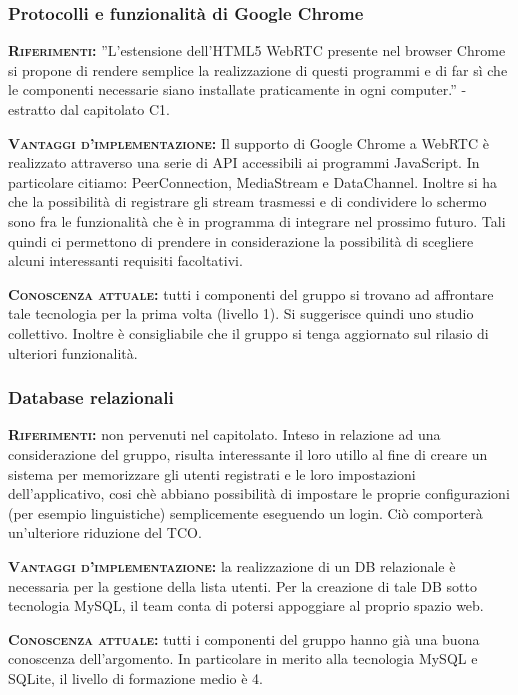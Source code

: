 \subsubsection{Protocolli e funzionalità di Google Chrome}
\begin{description}
	\item{\scshape\bfseries Riferimenti:}
  ''L'estensione dell'HTML5 WebRTC presente nel browser Chrome si propone di rendere semplice la realizzazione di questi programmi e di far sì che le componenti necessarie siano installate praticamente in ogni computer.'' - estratto dal capitolato C1.
  
 	\item{\scshape\bfseries Vantaggi d'implementazione:} Il supporto di Google Chrome a WebRTC è realizzato attraverso una serie di API accessibili ai programmi JavaScript. In particolare citiamo: PeerConnection, MediaStream e DataChannel. Inoltre si ha che la possibilità di registrare gli stream trasmessi e di condividere lo schermo sono fra le funzionalità che è in programma di integrare nel prossimo futuro. Tali quindi ci permettono di prendere in considerazione la possibilità di scegliere alcuni interessanti requisiti facoltativi.
	
	\item{\scshape\bfseries Conoscenza attuale:} tutti i componenti del gruppo si trovano ad affrontare tale tecnologia per la prima volta (livello 1). Si suggerisce quindi uno studio collettivo. Inoltre è consigliabile che il gruppo si tenga aggiornato sul rilasio di ulteriori funzionalità.
\end{description}

\subsubsection{Database relazionali}
\begin{description}
	\item{\scshape\bfseries Riferimenti:} non pervenuti nel capitolato. Inteso in relazione ad una considerazione del gruppo, risulta interessante il loro utillo al fine di creare un sistema per memorizzare gli utenti registrati e le loro impostazioni dell'applicativo, cosi chè abbiano possibilità di impostare le proprie configurazioni (per esempio linguistiche) semplicemente eseguendo un login. Ciò comporterà un'ulteriore riduzione del TCO.
  
 	\item{\scshape\bfseries Vantaggi d'implementazione:} la realizzazione di un DB relazionale è necessaria per la gestione della lista utenti. Per la creazione di tale DB sotto tecnologia MySQL, il team conta di potersi appoggiare al proprio spazio web.
	
	\item{\scshape\bfseries Conoscenza attuale:} tutti i componenti del gruppo hanno già una buona conoscenza dell'argomento. In particolare in merito alla tecnologia MySQL e SQLite, il livello di formazione medio è 4.
\end{description}

